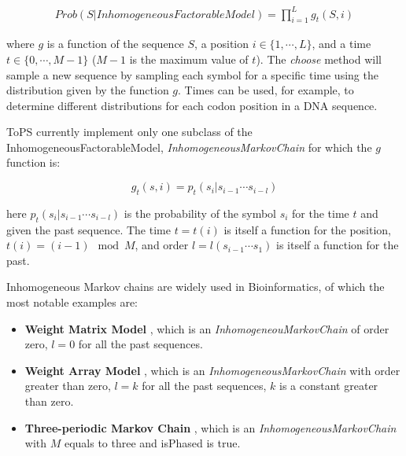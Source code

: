 \begin{align}
Prob(S|InhomogeneousFactorableModel)  =  \prod_{i=1}^L g_t(S, i)
\end{align}

where $g$ is a function of the sequence $S$, a position $i \in \{1,\cdots,L\}$, and a time $t \in \{0, \cdots,  M-1\}$ ($M-1$ is the maximum value of $t$). The \textit{choose} method will sample a new sequence by sampling each symbol for a specific time using the distribution given by the function $g$. Times can be used, for example, to determine different distributions for each codon position in a DNA sequence. 


ToPS currently implement only one subclass of the InhomogeneousFactorableModel, \textit{InhomogeneousMarkovChain} for which the $g$ function is:

\[ g_t(s, i) = p_t (s_i| s_{i-1}\cdots s_{i-l}) \]

here $p_t(s_i|s_{i-1}\cdots s_{i-l})$ is the probability of the symbol $s_i$ for the time $t$ and given the past sequence. The time $t = t(i)$ is itself a function for the position, $t(i) = (i-1) \mod   M$, and order $l = l(s_{i-1} \cdots s_1)$ is itself a function for the past.

Inhomogeneous Markov chains are widely used in Bioinformatics, of which the most notable examples are:
\begin{itemize}
\item {\bf Weight Matrix Model} \cite{Staden1984}, which is an \textit{Inhomogeneou\-Markov\-Chain} of order zero, $l = 0$ for all the past sequences.
\item {\bf Weight Array Model} \cite{Zhang1993}, which  is an \textit{Inhomogeneous\-Markov\-Chain} with order greater than zero, $l = k$ for all the past sequences, $k$ is a constant greater than zero.
\item {\bf Three-periodic Markov Chain} \cite{Borodovsky1993}, which  is an \textit{Inhomogeneous\-Markov\-Chain} with $M$ equals to three and isPhased is true.
\end{itemize}

